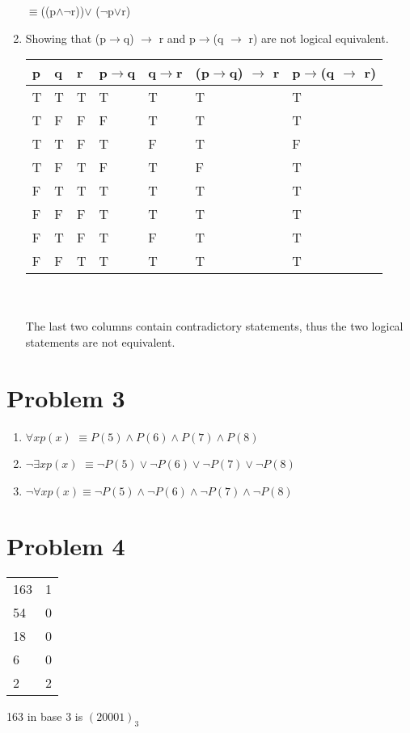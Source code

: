 \documentclass[12pt,letterpaper]{article}
\begin{document}
\begin{enumerate}
  \({\equiv}\)((p\({\land}\)\({\neg}\)r))\({\lor}\) (\({\neg}\)p\({\lor}\)r)\\
  \item Showing that (p\({\rightarrow}\)q) \({\rightarrow}\) r and p\({\rightarrow}\)(q \({\rightarrow}\) r) are not logical equivalent.\\
  \begin{tabular}{ | m{1cm} | m{1cm}| m{1cm} | m{1cm} | m{1cm}| m{3cm} | m{3cm} |}
    \hline
    \rowcolor{gray}
    p & q & r &p\({\rightarrow}\)q& q\({\rightarrow}\)r&(p\({\rightarrow}\)q) \({\rightarrow}\) r & p\({\rightarrow}\)(q \({\rightarrow}\) r)\\
    \hline
    T & T & T & T & T & T & T\\
    \hline
    T & F & F & F & T & T & T\\
    \hline
    T & T & F & T & F & T & F\\
    \hline
    T & F & T & F & T & F & T\\
    \hline
    F & T & T & T & T & T & T\\
    \hline
    F & F & F & T & T & T & T\\
    \hline
    F & T & F & T & F & T & T\\
    \hline
    F & F & T & T & T & T & T\\
    \hline
  \end{tabular}\\\\
  The last two columns contain contradictory statements, thus the two logical  statements are not equivalent.
\end{enumerate}
\section*{Problem 3}
\begin{enumerate}
  \item \({\forall}xp(x)\) \({\equiv} P(5) {\land} P(6) {\land} P(7) {\land} P(8)\)
  \item \({\neg}{\exists}xp(x)\) \({\equiv} {\neg}P(5) {\lor} {\neg}P(6) {\lor} {\neg}P(7) {\lor} {\neg}P(8)\)
  \item \({\neg}{\forall}xp(x)\)\({\equiv} {\neg}P(5) {\land} {\neg}P(6) {\land} {\neg}P(7) {\land} {\neg}P(8)\)
\end{enumerate}
\section*{Problem 4}
\begin{tabular}{  m{1cm} | m{1cm}}
  163 & 1\\
  54 & 0\\
  18 & 0\\
  6 & 0\\
  2 & 2\\
\end{tabular} 
163 in base 3 is \((20001)_3\)
\end{document}
